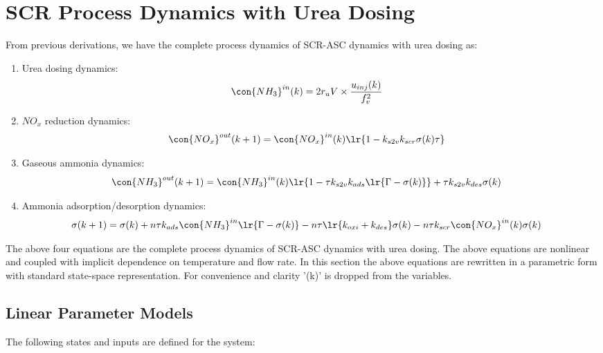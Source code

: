 \newpage
\section{SCR Process Dynamics with Urea Dosing \label{sec::proc_dyn}}
From previous derivations, we have the complete process dynamics of SCR-ASC dynamics with urea dosing as:

\begin{enumerate}
    \item Urea dosing dynamics:
    \begin{align*}
    \con{NH_3}^{in} (k) &= 2r_u V \times \frac{u_{inj}(k)}{f_v^2}
    \end{align*}

    \item $NO_x$ reduction dynamics:
    \begin{align*}
    \con{NO_x}^{out} (k + 1) &= \con{NO_x}^{in} (k) \lr{1 - k_{s2v} k_{scr} \sigma(k) \tau}
    \end{align*}

    \item Gaseous ammonia dynamics:
    \begin{align*}
    \con{NH_3}^{out} (k + 1) &= \con{NH_3}^{in}(k) \lr{1 - \tau k_{s2v}k_{ads} \lr{\Gamma - \sigma(k)}} + \tau k_{s2v} k_{des} \sigma(k)
    \end{align*}

    \item Ammonia adsorption/desorption dynamics:
 \begin{align*}
        \sigma(k + 1) &= \sigma(k)
        + n\tau k_{ads} \con{NH_3}^{in} \lr{\Gamma - \sigma(k)}
        - n \tau \lr{k_{oxi} + k_{des}} \sigma(k)
        - n \tau k_{scr} \con{NO_x}^{in}(k) \sigma(k)
    \end{align*}
\end{enumerate}

The above four equations are the complete process dynamics of SCR-ASC dynamics with urea dosing. The above equations are
nonlinear and coupled with implicit dependence on temperature and flow rate. In this section the above equations are
rewritten in a parametric form with standard state-space representation. For convenience and clarity '(k)' is dropped
from the variables.

\subsection{Linear Parameter Models}
The following states and inputs are defined for the system:


